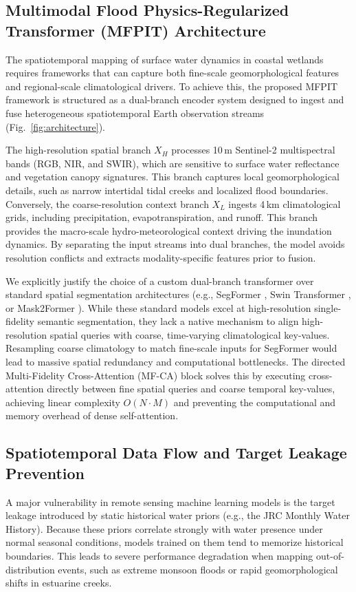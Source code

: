 \documentclass[preprint,12pt]{elsarticle}
\begin{document}
\subsection{Multimodal Flood Physics-Regularized Transformer (MFPIT) Architecture}
The spatiotemporal mapping of surface water dynamics in coastal wetlands requires frameworks that can capture both fine-scale geomorphological features and regional-scale climatological drivers. To achieve this, the proposed MFPIT framework is structured as a dual-branch encoder system designed to ingest and fuse heterogeneous spatiotemporal Earth observation streams (Fig.~\ref{fig:architecture}). 

The high-resolution spatial branch $X_H$ processes 10\,m Sentinel-2 multispectral bands (RGB, NIR, and SWIR), which are sensitive to surface water reflectance and vegetation canopy signatures. This branch captures local geomorphological details, such as narrow intertidal tidal creeks and localized flood boundaries. Conversely, the coarse-resolution context branch $X_L$ ingests 4\,km climatological grids, including precipitation, evapotranspiration, and runoff. This branch provides the macro-scale hydro-meteorological context driving the inundation dynamics. By separating the input streams into dual branches, the model avoids resolution conflicts and extracts modality-specific features prior to fusion.

We explicitly justify the choice of a custom dual-branch transformer over standard spatial segmentation architectures (e.g., SegFormer \cite{xie_segformer_2021}, Swin Transformer \cite{liu_swin_2021}, or Mask2Former \cite{cheng_masked_2022}). While these standard models excel at high-resolution single-fidelity semantic segmentation, they lack a native mechanism to align high-resolution spatial queries with coarse, time-varying climatological key-values. Resampling coarse climatology to match fine-scale inputs for SegFormer would lead to massive spatial redundancy and computational bottlenecks. The directed Multi-Fidelity Cross-Attention (MF-CA) block solves this by executing cross-attention directly between fine spatial queries and coarse temporal key-values, achieving linear complexity $O(N \cdot M)$ and preventing the computational and memory overhead of dense self-attention.

\subsection{Spatiotemporal Data Flow and Target Leakage Prevention}
A major vulnerability in remote sensing machine learning models is the target leakage introduced by static historical water priors (e.g., the JRC Monthly Water History). Because these priors correlate strongly with water presence under normal seasonal conditions, models trained on them tend to memorize historical boundaries. This leads to severe performance degradation when mapping out-of-distribution events, such as extreme monsoon floods or rapid geomorphological shifts in estuarine creeks.
\end{document}
